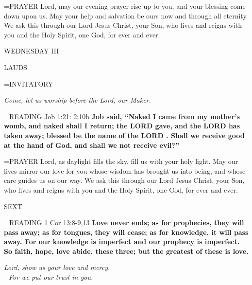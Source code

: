 \hangindent=\parindent \small{PRAYER  Lord, may our evening prayer rise up to you, and your blessing come down upon us. May your help and salvation be ours now and through all eternity. We ask this through our Lord Jesus Christ, your Son, who lives and reigns with you and the Holy Spirit, one God, for ever and ever.}

\begin{center}
\normalsize WEDNESDAY III
\end{center}

\begin{flushleft}\normalsize LAUDS\\\end{flushleft}

\hangindent=\parindent \small{INVITATORY}
\begin{center}
\textit{Come, let us worship before the Lord, our Maker.\\}
\end{center}

\hangindent=\parindent \small{READING} Job 1:21: 2:10b \textbf{Job said, “Naked I came from my mother’s womb, and naked shall I return; the LORD gave, and the LORD has taken away; blessed be the name of the LORD . Shall we receive good at the hand of God, and shall we not receive evil?”\\}

\hangindent=\parindent \small{PRAYER  Lord, as daylight fills the sky, fill us with your holy light. May our lives mirror our love for you whose wisdom has brought us into being, and whose care guides us on our way. We ask this through our Lord Jesus Christ, your Son, who lives and reigns with you and the Holy Spirit, one God, for ever and ever.}

\begin{flushleft}\normalsize SEXT\\\end{flushleft}

\hangindent=\parindent \small{READING} 1 Cor 13:8-9,13 \textbf{Love never ends; as for prophecies, they will pass away; as for tongues, they will cease; as for knowledge, it will pass away. For our knowledge is imperfect and our prophecy is imperfect. So faith, hope, love abide, these three; but the greatest of these is love.}

\begin{center}
\textit{Lord, show us your love and mercy.\\
- For we put our trust in you.}
\end{center}

